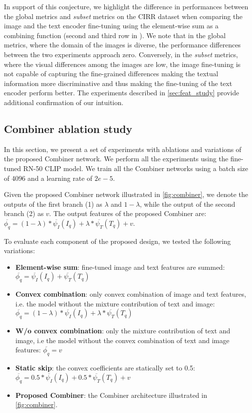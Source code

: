 \documentclass[acmlarge]{acmart}
\begin{document}
In support of this conjecture, we highlight the difference in performances between the global metrics and \textit{subset} metrics on the CIRR dataset when comparing the image and the text encoder fine-tuning using the element-wise sum as a combining function (second and third row in ). 
We note that in the global metrics, where the domain of the images is diverse, the performance differences between the two experiments approach zero. Conversely, in the \textit{subset} metrics, where the visual differences among the images are low, the image fine-tuning is not capable of capturing the fine-grained differences making the textual information more discriminative and thus making the fine-tuning of the text encoder perform better.
The experiments described in \cref{sec:feat_study} provide additional confirmation of our intuition.


\subsection{Combiner ablation study}\label{sec:ablation}
In this section, we present a set of experiments with ablations and variations of the proposed Combiner network. We perform all the experiments using the fine-tuned RN-50 CLIP model. We train all the Combiner networks using a batch size of 4096 and a learning rate of $2e-5$.

Given the proposed Combiner network illustrated in \cref{fig:combiner}, we denote the outputs of the first branch (1) as $\lambda$ and $1 -\lambda$, while the output of the second branch (2) as $v$.
The output features of the proposed Combiner are: $\overline{\phi_q} = (1 - \lambda)* \overline{\psi_{I}}(I_q) + \lambda * \overline{\psi_{T}}(T_q) + v$.

To evaluate each component of the proposed design, we tested the following variations:


\begin{itemize}
    \item \textbf{Element-wise sum}: fine-tuned image and text features are summed: $\overline{\phi_q} = \overline{\psi_{I}}(I_q) + \overline{\psi_{T}}(T_q)$
    \item \textbf{Convex combination}: only convex combination of image and text features, i.e. the model without the mixture contribution of text and image: $\overline{\phi_q} = (1 - \lambda)* \overline{\psi_{I}}(I_q) + \lambda * \overline{\psi_{T}}(T_q)$
    \item \textbf{W/o convex combination}: only the mixture contribution of text and image, i.e the model without the convex combination of text and image features: $\overline{\phi_q} = v$
\item \textbf{Static skip}: the convex coefficients are statically set to 0.5: $\overline{\phi_q} = 0.5 * \overline{\psi_{I}}(I_q) + 0.5 * \overline{\psi_{T}}(T_q) + v$
\item \textbf{Proposed Combiner}: the Combiner architecture illustrated in \cref{fig:combiner}.
\end{itemize}
\end{document}
